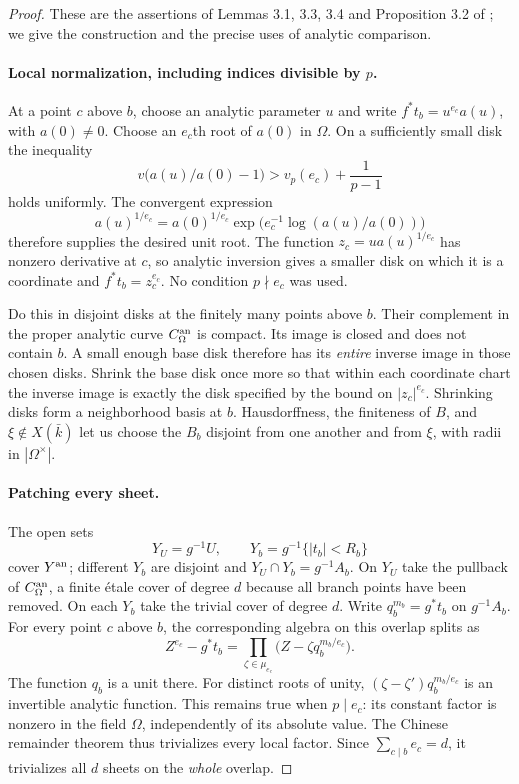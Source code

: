 \begin{proof}
These are the assertions of Lemmas 3.1, 3.3, 3.4 and Proposition 3.2
of \citet{D_OpenAI2026}; we give the construction and the precise
uses of analytic comparison.

\paragraph{Local normalization, including indices divisible by $p$.}
At a point $c$ above $b$, choose an analytic parameter $u$ and write
$f^*t_b=u^{e_c}a(u)$, with $a(0)\ne0$. Choose an $e_c$th root of
$a(0)$ in $\Omega$. On a sufficiently small disk the inequality
\[
 v\bigl(a(u)/a(0)-1\bigr)>v_p(e_c)+\frac1{p-1}
\]
holds uniformly. The convergent expression
\[
 a(u)^{1/e_c}=a(0)^{1/e_c}
       \exp\bigl(e_c^{-1}\log(a(u)/a(0))\bigr)
\]
therefore supplies the desired unit root. The function
$z_c=u a(u)^{1/e_c}$ has nonzero derivative at $c$, so analytic
inversion gives a smaller disk on which it is a coordinate and
$f^*t_b=z_c^{e_c}$. No condition $p\nmid e_c$ was used.

Do this in disjoint disks at the finitely many points above $b$.
Their complement in the proper analytic curve $C_\Omega^{\rm an}$
is compact. Its image is closed and does not contain $b$.
A small enough base disk therefore has its \emph{entire} inverse
image in those chosen disks. Shrink the base disk once more so that
within each coordinate chart the inverse image is exactly the disk
specified by the bound on $|z_c|^{e_c}$. Shrinking disks form a
neighborhood basis at $b$. Hausdorffness, the finiteness of $B$, and
$\xi\notin X(\bar k)$ let us choose the $B_b$ disjoint from one
another and from $\xi$, with radii in $|\Omega^\times|$.

\paragraph{Patching every sheet.}
\label{clm:D15-patching}
The open sets
\[
 Y_U=g^{-1}U,
 \qquad Y_b=g^{-1}\{|t_b|<R_b\}
\]
cover $Y^{\rm an}$; different $Y_b$ are disjoint and
$Y_U\cap Y_b=g^{-1}A_b$. On $Y_U$ take the pullback of
$C_\Omega^{\rm an}$, a finite \'etale cover of degree $d$ because
all branch points have been removed. On each $Y_b$ take the trivial
cover of degree $d$. Write $q_b^{m_b}=g^*t_b$ on $g^{-1}A_b$.
For every point $c$ above $b$, the corresponding algebra on this
overlap splits as
\[
 Z^{e_c}-g^*t_b
   =\prod_{\zeta\in\mu_{e_c}}
              \bigl(Z-\zeta q_b^{m_b/e_c}\bigr).
\]
The function $q_b$ is a unit there. For distinct roots of unity,
$(\zeta-\zeta')q_b^{m_b/e_c}$ is an invertible analytic function.
This remains true when $p\mid e_c$: its constant factor is nonzero
in the field $\Omega$, independently of its absolute value.
The Chinese remainder theorem thus trivializes every local factor.
Since $\sum_{c\mid b}e_c=d$, it trivializes all $d$ sheets on the
\emph{whole} overlap.


\end{proof}
